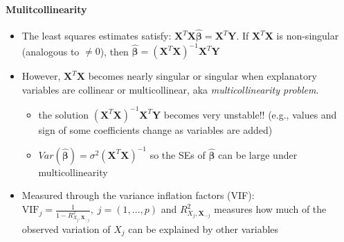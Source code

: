 \documentclass[]{article}
\providecommand{\tightlist}{%
  \setlength{\itemsep}{0pt}\setlength{\parskip}{0pt}}
\let\oldparagraph\paragraph
\renewcommand{\paragraph}[1]{\oldparagraph{#1}\mbox{}}
\begin{document}
\hypertarget{mulitcollinearity}{%
\paragraph{Mulitcollinearity}\label{mulitcollinearity}}

\begin{itemize}
\tightlist
\item
  The least squares estimates satisfy:
  \(\mathbf{X}^T\mathbf{X}\hat{\mathbf{\beta}}=\mathbf{X}^T\mathbf{Y}\).
  If \(\mathbf{X}^T\mathbf{X}\) is non-singular (analogous to
  \(\neq 0\)), then
  \(\hat{\mathbf{\beta}}=(\mathbf{X}^T\mathbf{X})^{-1}\mathbf{X}^T\mathbf{Y}\)\\
\item
  However, \(\mathbf{X}^T\mathbf{X}\) becomes nearly singular or
  singular when explanatory variables are collinear or multicollinear,
  aka \emph{multicollinearity problem}.

  \begin{itemize}
  \tightlist
  \item
    the solution \((\mathbf{X}^T\mathbf{X})^{-1}\mathbf{X}^T\mathbf{Y}\)
    becomes very unstable!! (e.g., values and sign of some coefficients
    change as variables are added)\\
  \item
    \(Var(\hat{\mathbf{\beta}})=\sigma^2(\mathbf{X}^T\mathbf{X})^{-1}\)
    so the SEs of \(\hat{\mathbf{\beta}}\) can be large under
    multicollinearity\\
  \end{itemize}
\item
  Measured through the variance inflation factors (VIF):
  \(\text{VIF}_j=\frac{1}{1-R^2_{X_j,\boldsymbol{X}_{-j}}}, \; j=(1,\ldots,p)\)
  and \(R^2_{X_j,\boldsymbol{X}_{-j}}\) measures how much of the
  observed variation of \(X_j\) can be explained by other variables
\end{itemize}
\end{document}
